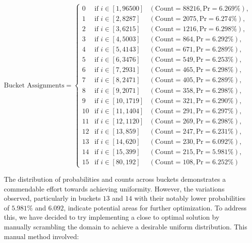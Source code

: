 \renewcommand{\arraystretch}{1.25}
\[
\text{Bucket Assignments} = \left\{
\begin{array}{lll}
    0 & \text{if } i \in [1, 96500] & (\text{Count} = 88216, \text{Pr} = 6.269\%), \\
    1 & \text{if } i \in [2, 8287] & (\text{Count} = 2075, \text{Pr} = 6.274\%), \\
    2 & \text{if } i \in [3, 6215] & (\text{Count} = 1216, \text{Pr} = 6.298\%), \\
    3 & \text{if } i \in [4, 5003] & (\text{Count} = 864, \text{Pr} = 6.292\%), \\
    4 & \text{if } i \in [5, 4143] & (\text{Count} = 671, \text{Pr} = 6.289\%), \\
    5 & \text{if } i \in [6, 3476] & (\text{Count} = 549, \text{Pr} = 6.253\%), \\
    6 & \text{if } i \in [7, 2931] & (\text{Count} = 465, \text{Pr} = 6.298\%), \\
    7 & \text{if } i \in [8, 2471] & (\text{Count} = 405, \text{Pr} = 6.289\%), \\
    8 & \text{if } i \in [9, 2071] & (\text{Count} = 358, \text{Pr} = 6.298\%), \\
    9 & \text{if } i \in [10, 1719] & (\text{Count} = 321, \text{Pr} = 6.290\%), \\
    10 & \text{if } i \in [11, 1404] & (\text{Count} = 291, \text{Pr} = 6.297\%), \\
    11 & \text{if } i \in [12, 1120] & (\text{Count} = 269, \text{Pr} = 6.298\%), \\
    12 & \text{if } i \in [13, 859] & (\text{Count} = 247, \text{Pr} = 6.231\%), \\
    13 & \text{if } i \in [14, 620] & (\text{Count} = 230, \text{Pr} = 6.092\%), \\
    14 & \text{if } i \in [15, 399] & (\text{Count} = 215, \text{Pr} = 5.981\%), \\
    15 & \text{if } i \in [80, 192] & (\text{Count} = 108, \text{Pr} = 6.252\%)
\end{array}
\right.
\]

The distribution of probabilities and counts across buckets demonstrates a commendable effort towards achieving uniformity. However, the variations observed, particularly in buckets \(13\) and \(14\) with their notably lower probabilities of \(5.981\%\) and \(6.092\), indicate potential areas for further optimization. To address this, we have decided to try implementing a close to optimal solution by manually scrambling the domain to achieve a desirable uniform distribution. This manual method involved:

